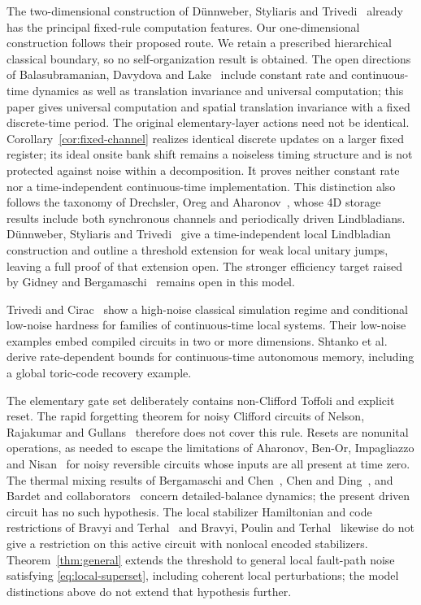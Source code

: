 The two-dimensional construction of D\"unnweber, Styliaris and Trivedi~\cite{DST2026} already has the principal fixed-rule computation features. Our one-dimensional construction follows their proposed route. We retain a prescribed hierarchical classical boundary, so no self-organization result is obtained. The open directions of Balasubramanian, Davydova and Lake~\cite{BDL2026} include constant rate and continuous-time dynamics as well as translation invariance and universal computation; this paper gives universal computation and spatial translation invariance with a fixed discrete-time period. The original elementary-layer actions need not be identical. Corollary~\ref{cor:fixed-channel} realizes identical discrete updates on a larger fixed register; its ideal onsite bank shift remains a noiseless timing structure and is not protected against noise within a decomposition. It proves neither constant rate nor a time-independent continuous-time implementation. This distinction also follows the taxonomy of Drechsler, Oreg and Aharonov~\cite{DOA2026}, whose 4D storage results include both synchronous channels and periodically driven Lindbladians. D\"unnweber, Styliaris and Trivedi~\cite[Section~VII]{DST2026} give a time-independent local Lindbladian construction and outline a threshold extension for weak local unitary jumps, leaving a full proof of that extension open. The stronger efficiency target raised by Gidney and Bergamaschi~\cite{GB2025} remains open in this model.

Trivedi and Cirac~\cite{TC2022} show a high-noise classical simulation regime and conditional low-noise hardness for families of continuous-time local systems. Their low-noise examples embed compiled circuits in two or more dimensions. Shtanko et al.~\cite{SLLGA2025} derive rate-dependent bounds for continuous-time autonomous memory, including a global toric-code recovery example.

The elementary gate set deliberately contains non-Clifford Toffoli and explicit reset. The rapid forgetting theorem for noisy Clifford circuits of Nelson, Rajakumar and Gullans~\cite{NRG2026} therefore does not cover this rule. Resets are nonunital operations, as needed to escape the limitations of Aharonov, Ben-Or, Impagliazzo and Nisan~\cite{ABIN1996} for noisy reversible circuits whose inputs are all present at time zero. The thermal mixing results of Bergamaschi and Chen~\cite{BC2025}, Chen and Ding~\cite{CD2026}, and Bardet and collaborators~\cite{Bardet2023} concern detailed-balance dynamics; the present driven circuit has no such hypothesis. The local stabilizer Hamiltonian and code restrictions of Bravyi and Terhal~\cite{BravyiTerhal2009} and Bravyi, Poulin and Terhal~\cite{BPT2010} likewise do not give a restriction on this active circuit with nonlocal encoded stabilizers. Theorem~\ref{thm:general} extends the threshold to general local fault-path noise satisfying \eqref{eq:local-superset}, including coherent local perturbations; the model distinctions above do not extend that hypothesis further.

